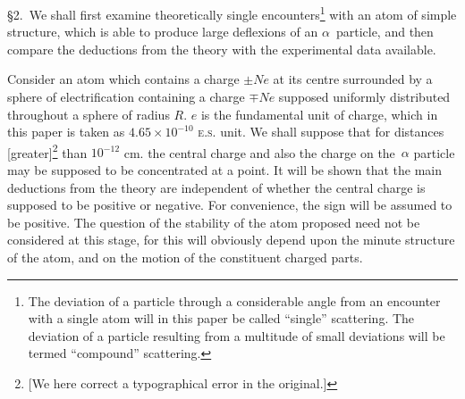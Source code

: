 \smallskip

\S2.\ We shall first examine theoretically single encounters\footnote{The
  deviation of a particle through a considerable angle from an encounter
  with a single atom will in this paper be called ``single'' scattering.
  The deviation of a particle resulting from a multitude of small
  deviations will be termed ``compound'' scattering.} with an atom of
simple structure, which is able to produce large deflexions of an
$\alpha$~particle, and then compare the deductions from the theory with
the experimental data available.

Consider an atom which contains a charge $\pm Ne$ at its centre
surrounded by a sphere of electrification containing a charge $\mp Ne$
supposed uniformly distributed throughout a sphere of radius $R$.
$e$ is the fundamental unit of charge, which in this paper is taken
as $4.65 \times  10^{-10}$ \textsc{e.s.} unit. We shall suppose that for distances
{[}greater{]}\footnote{{[}We here correct a typographical error in the
  original.{]}} than $10^{-12}$ cm. the central charge and also the charge on
the~$\alpha$ particle may be supposed to be concentrated at a point. It
will be shown that the main deductions from the theory are independent
of whether the central charge is supposed to be positive or negative.
For convenience, the sign will be assumed to be positive. The question
of the stability of the atom proposed need not be considered at this
stage, for this will obviously depend upon the minute structure of the
atom, and on the motion of the constituent charged parts.

